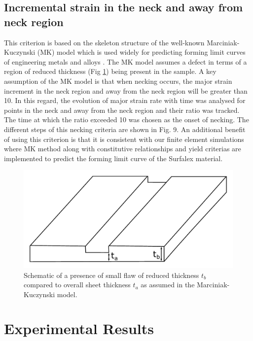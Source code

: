 \documentclass[11pt]{article} %
\begin{document}
\subsection{Incremental strain in the neck and away from neck region}
This criterion is based on the skeleton structure of the well-known Marciniak-Kuczynski (MK) model which is used widely for predicting forming limit curves of engineering metals and alloys \cite{Banabic2010}. The MK model assumes a defect in terms of a region of reduced thickness (Fig \ref{fig:mk_flaw}) being present in the sample. A key assumption of the MK model is that when necking occurs, the major strain increment in the neck region and away from the neck region will be greater than 10\cite{Narasimhan1991}. In this regard, the evolution of major strain rate with time was analysed for points in the neck and away from the neck region and their ratio was tracked. The time at which the ratio exceeded 10 was chosen as the onset of necking. The different steps of this necking criteria are shown in Fig. 9. An additional benefit of using this criterion is that it is consistent with our finite element simulations where MK method along with constitutive relationships and yield criterias are implemented to predict the forming limit curve of the Surfalex material.   

\begin{figure}[h]
	\includegraphics[width=\textwidth]{figures/mk_flaw}
	\centering
	\caption{Schematic of a presence of small flaw of reduced thickness $t_b$ compared to overall sheet thickness $t_a$ as assumed in the Marciniak-Kuczynski model.}
	\label{fig:mk_flaw}
\end{figure}

\section{Experimental Results}
\end{document}
